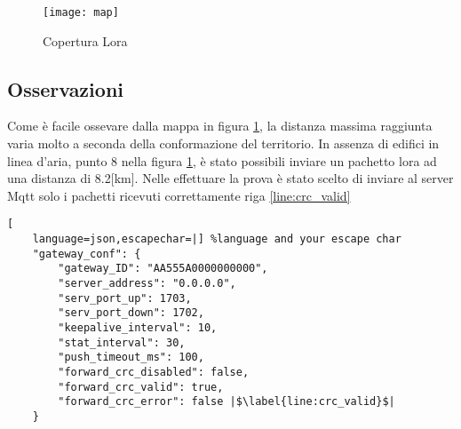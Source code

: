 \begin{figure}[h]
\centering 
\texttt{[image: map]}
\caption{Copertura Lora}
\label{fig:map}
\end{figure}

\subsection{Osservazioni}
Come è facile ossevare dalla mappa in figura \ref{fig:map}, la distanza
massima raggiunta varia molto a seconda della conformazione del territorio. In
assenza di edifici in linea d'aria,  punto 8 nella figura \ref{fig:map}, è stato
possibili inviare un pachetto lora ad una distanza di 8.2[km]. Nelle effettuare
la prova è stato scelto di inviare al server Mqtt solo i pachetti ricevuti
correttamente riga \ref{line:crc_valid}
\begin{lstlisting}[
    language=json,escapechar=|] %language and your escape char
    "gateway_conf": {
        "gateway_ID": "AA555A0000000000",
        "server_address": "0.0.0.0",
        "serv_port_up": 1703,
        "serv_port_down": 1702,
        "keepalive_interval": 10,
        "stat_interval": 30,
        "push_timeout_ms": 100,
        "forward_crc_disabled": false,
        "forward_crc_valid": true, 
        "forward_crc_error": false |$\label{line:crc_valid}$|
    }
\end{lstlisting}



